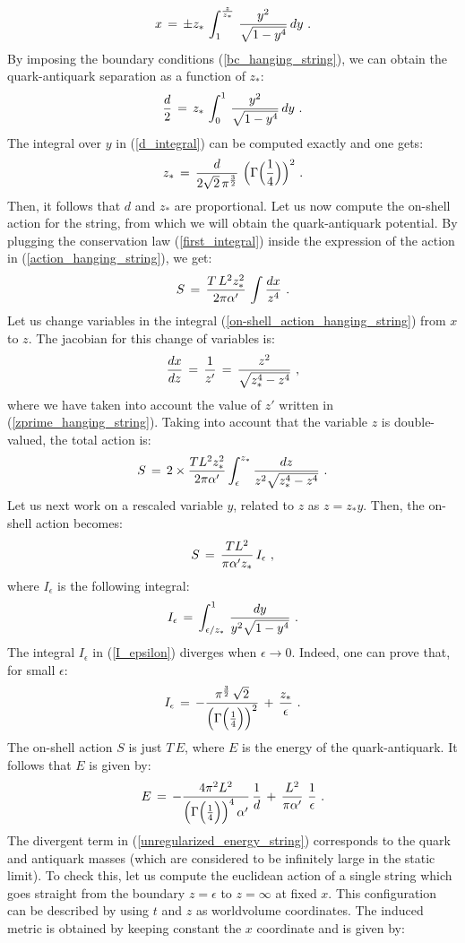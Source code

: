 \documentclass[12pt,notitlepage]{article}
\newcommand{\beq}{\begin{equation}}
\newcommand{\eeq}{\end{equation}}
\begin{document}
\beq
x\,=\,\pm z_*\,\int_{1}^{{z\over z_*}}\,
{y^2\over \sqrt{1-y^4}}\,dy\,\,.
\eeq
By imposing the boundary conditions (\ref{bc_hanging_string}), we can obtain the quark-antiquark separation as a function of $z_*$:
\beq
{d\over 2}\,=\,z_*\,\int_{0}^{1}\,{y^2\over \sqrt{1-y^4}}\,dy\,\,.
\label{d_integral}
\eeq
The integral over $y$ in (\ref{d_integral}) can be computed exactly and one gets:
\beq
z_*\,=\,{d\over  2\sqrt{2}\,\pi^{{3\over 2}}}\,\,
\Big(\Gamma\Big({1\over 4}\Big)\Big)^2\,\,.
\eeq
Then, it follows that $d$ and $z_*$ are proportional.  Let us now compute the on-shell action for the string, from which we will obtain the quark-antiquark potential. By plugging the conservation law (\ref{first_integral}) inside the expression  of the action in (\ref{action_hanging_string}), we get:
\beq
S\,=\,{T\,L^2 z_*^2\over 2\pi\alpha'}\,\int {dx\over z^4}\,\,.
\label{on-shell_action_hanging_string}
\eeq
Let us change variables in the integral  (\ref{on-shell_action_hanging_string}) from $x$ to $z$. The jacobian for this change of variables  is:
\beq
{dx\over dz}\,=\,{1\over z'}\,=\,{z^2\over \sqrt{z_*^4-z^4}}\,\,,
\eeq
where we have taken into account the value of $z'$ written in (\ref{zprime_hanging_string}). Taking into account that the variable $z$ is double-valued, the total action is:
\beq
S\,=\,2\times {T L^2 z_*^2\over 2\pi\alpha'} \int_{\epsilon}^{z_*}
{dz\over z^2\sqrt{z_*^4-z^4}}\,\,.
\eeq
Let us next work on a rescaled variable $y$, related to $z$ as $z=z_* y$. Then, the on-shell action becomes:
\beq
S\,=\,{T L^2 \over \pi\alpha'z_*}\,I_{\epsilon}\,\,,
\eeq
where $I_{\epsilon}$ is the following integral:
\beq
I_{\epsilon}\,=\,\int_{\epsilon/z_*}^{1}\,
{dy\over y^2\sqrt{1-y^4}}\,\,.
\label{I_epsilon}
\eeq
The integral $I_{\epsilon}$ in (\ref{I_epsilon})  diverges when $\epsilon\to 0$. Indeed, one can prove that, for small $\epsilon$:
\beq
I_{\epsilon}\,=\,-{\pi^{{3\over 2}}\,\sqrt{2}\over \Big(\Gamma\Big({1\over 4}\Big)\Big)^2}\,+\,{z_*\over \epsilon}\,\,.
\eeq
The  on-shell action $S$ is just $T\,E$, where $E$ is the energy of the quark-antiquark. It follows that $E$ is given by:
\beq
E\,=\,-{4\pi^2 L^2\over \Big(\Gamma\Big({1\over 4}\Big)\Big)^4\,\alpha'}\,{1\over d}\,+\,
{L^2\over \pi\alpha'}\,\,{1\over \epsilon}\,\,.
\label{unregularized_energy_string}
\eeq
The divergent term  in (\ref{unregularized_energy_string}) corresponds to the quark  and antiquark masses (which are considered to be infinitely large in the static limit). To check this, let us compute the euclidean action of a single string which goes straight  from the boundary $z=\epsilon$ to $z=\infty$ at fixed $x$. This configuration can be described by using $t$ and $z$ as worldvolume coordinates. The induced metric is obtained by keeping constant the $x$ coordinate and is given by:
\end{document}
